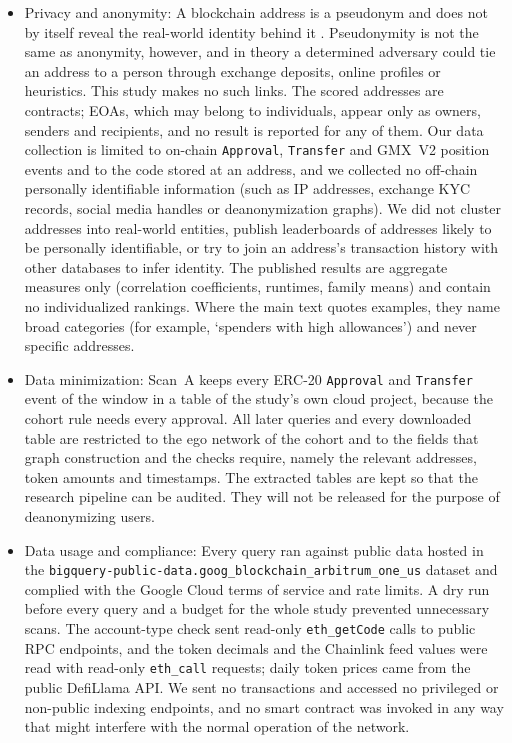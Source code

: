 \begin{itemize}
\item{}\label{sub:privacy-anonymity}
  Privacy and anonymity: A blockchain address is a pseudonym and does not by itself reveal the real-world identity behind it \parencite{packin2024credit}. Pseudonymity is not the same as anonymity, however, and in theory a determined adversary could tie an address to a person through exchange deposits, online profiles or heuristics. This study makes no such links. The scored addresses are contracts; EOAs, which may belong to individuals, appear only as owners, senders and recipients, and no result is reported for any of them. Our data collection is limited to on-chain \texttt{Approval}, \texttt{Transfer} and GMX~V2 position events and to the code stored at an address, and we collected no off-chain personally identifiable information (such as IP addresses, exchange KYC records, social media handles or deanonymization graphs). We did not cluster addresses into real-world entities, publish leaderboards of addresses likely to be personally identifiable, or try to join an address's transaction history with other databases to infer identity. The published results are aggregate measures only (correlation coefficients, runtimes, family means) and contain no individualized rankings. Where the main text quotes examples, they name broad categories (for example, `spenders with high allowances') and never specific addresses.


\item{}\label{sub:data-minimization}
  Data minimization: Scan~A keeps every ERC-20 \texttt{Approval} and \texttt{Transfer} event of the window in a table of the study's own cloud project, because the cohort rule needs every approval. All later queries and every downloaded table are restricted to the ego network of the cohort and to the fields that graph construction and the checks require, namely the relevant addresses, token amounts and timestamps. The extracted tables are kept so that the research pipeline can be audited. They will not be released for the purpose of deanonymizing users.


\item{}\label{sub:data-usage-compliance}
  Data usage and compliance: Every query ran against public data hosted in the \texttt{bigquery-public-data.goog\_blockchain\_arbitrum\_one\_us} dataset and complied with the Google Cloud terms of service and rate limits. A dry run before every query and a budget for the whole study prevented unnecessary scans. The account-type check sent read-only \texttt{eth\_getCode} calls to public RPC endpoints, and the token decimals and the Chainlink feed values were read with read-only \texttt{eth\_call} requests; daily token prices came from the public DefiLlama API. We sent no transactions and accessed no privileged or non-public indexing endpoints, and no smart contract was invoked in any way that might interfere with the normal operation of the network.



\end{itemize}
